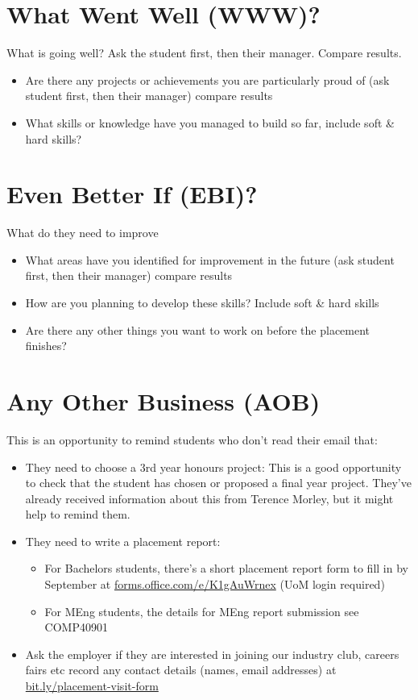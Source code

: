 \documentclass[
]{book}
\providecommand{\tightlist}{%
  \setlength{\itemsep}{0pt}\setlength{\parskip}{0pt}}
\begin{document}
\section{What Went Well (WWW)?}\label{www}

What is going well? Ask the student first, then their manager. Compare results.

\begin{itemize}
\tightlist
\item
  Are there any projects or achievements you are particularly proud of (ask student first, then their manager) compare results
\item
  What skills or knowledge have you managed to build so far, include soft \& hard skills?
\end{itemize}

\section{Even Better If (EBI)?}\label{ebi}

What do they need to improve

\begin{itemize}
\tightlist
\item
  What areas have you identified for improvement in the future (ask student first, then their manager) compare results
\item
  How are you planning to develop these skills? Include soft \& hard skills
\item
  Are there any other things you want to work on before the placement finishes?
\end{itemize}

\section{Any Other Business (AOB)}\label{aob}

This is an opportunity to remind students who don't read their email that:

\begin{itemize}
\tightlist
\item
  They need to choose a 3rd year honours project: This is a good opportunity to check that the student has chosen or proposed a final year project. They've already received information about this from Terence Morley, but it might help to remind them.
\item
  They need to write a placement report:

  \begin{itemize}
  \tightlist
  \item
    For Bachelors students, there's a short placement report form to fill in by September at \href{https://forms.office.com/e/K1gAuWrnex}{forms.office.com/e/K1gAuWrnex} (UoM login required)
  \item
    For MEng students, the details for MEng report submission see COMP40901
  \end{itemize}
\item
  Ask the employer if they are interested in joining our industry club, careers fairs etc record any contact details (names, email addresses) at \url{bit.ly/placement-visit-form}
\end{itemize}
\end{document}
